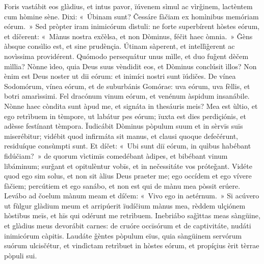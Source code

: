 Foris vastábit eos glàdius, et intus pavor, ïúvenem sìmul ac vìrǧinem, lactèntem cum hòmine sène.
Dixi: «~Úbinam sunt? Čessáre fàčiam ex homìnibus memóriam eórum.~»
Sed pròpter iram inimicórum dìstuli: ne forte superbírent hòstes eórum, et díčerent: «~Mànus nostra exčèlsa, et non Dòminus, féčit haec òmnia.~»
Ǧèns àbsque consìlio est, et sine prudènçia.
Útinam sàperent, et intellìǧerent ac novìssima providérent.
Quómodo persequátur unus mìlle, et duo fuǧent dèčem mìllia? Nònne ìdeo, quia Deus suus vèndidit eos, et Dòminus conclúsit ìllos?
Non ènim est Deus noster ut dii eórum: et inimíci nostri sunt ïúdičes.
De vínea Sodomórum, vínea eórum, et de suburbánis Gomórae: uva eórum, uva fèllis, et botri amarìssimi.
Fel dracónum vinum eórum, et venénum àspidum insanábile.
Nònne haec còndita sunt àpud me, et signáta in thesáuris meis?
Mea est ùltio, et ego retrìbuem in tèmpore, ut labátur pes eórum; ïuxta est dies perdiçiónis, et adèsse festínant tèmpora.
Ïudicábit Dòminus pòpulum suum et in sèrvīs suīs miserébitur; vidébit quod infirmáta sit manus, et clausi quoque defečérunt, residuíque consùmpti sunt.
Et díčet: «~Ubi sunt diī eórum, in quìbus habébant fidúčiam?~»
de quorum vìctimīs comedébant àdipes, et bibébant vinum libáminum; surǧant et opitulèntur vobīs, et in nečessitáte vos próteǧant.
Vidéte quod ego sim solus, et non sit àlius Deus praeter me; ego occídem et ego vívere fàčiem; percútiem et ego sanábo, et non est qui de mànu mea pòssit erúere.
Levábo ad čoelum mànum meam et díčem: «~Vivo ego in aetérnum.~»
Si acúvero ut fùlgur glàdium meum et arripúerit ïudíčium mànus mea, rèddem ulçiónem hòstibus meīs, et hīs qui odérunt me retrìbuem.
Inebriábo saǧìttas meas sàngüine, et glàdius meus devorábit carnes: de cruóre occīsórum et de captivitáte, nudáti inimicórum càpitis.
Laudáte ǧèntes pòpulum eïus, quia sàngüinem servórum suórum ulcisčétur, et vindìctam retrìbuet in hòstes eórum, et propíçius èrit tèrrae pòpuli sui.
